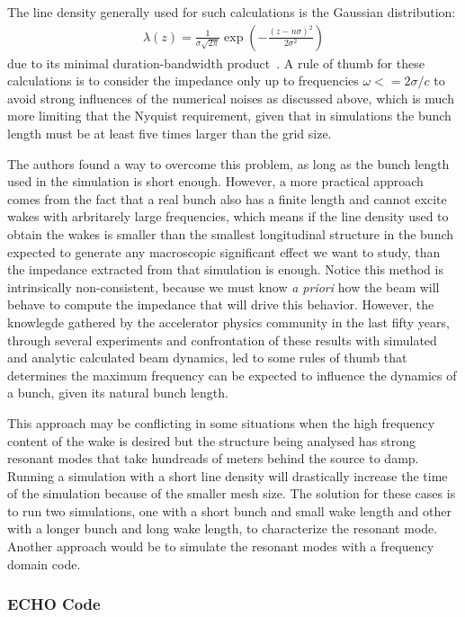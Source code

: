     The line density generally used for such calculations is the Gaussian distribution:
    \begin{align}
        \lambda(z) = \frac{1}{\sigma\sqrt{2\pi}}
        \exp\left(-\frac{(z-n\sigma)^2}{2\sigma^2}\right)
    \end{align}
    due to its minimal duration-bandwidth product~\cite{Niedermayer2016}. A rule of thumb for these calculations is to consider the impedance only up to frequencies $\omega<=2\sigma/c$ to avoid strong influences of the numerical noises as discussed above, which is much more limiting that the Nyquist requirement, given that in simulations the bunch length must be at least five times larger than the grid size.

    The authors  found a way to overcome this problem, as long as the bunch length used in the simulation is short enough. However, a more practical approach comes from the fact that a real bunch also has a finite length and cannot excite wakes with arbritarely large frequencies, which means if the line density used to obtain the wakes is smaller than the smallest longitudinal structure in the bunch expected to generate any macroscopic significant effect we want to study, than the impedance extracted from that simulation is enough. Notice this method is intrinsically non-consistent, because we must know \emph{a priori} how the beam will behave to compute the impedance that will drive this behavior. However, the knowlegde gathered by the accelerator physics community in the last fifty years, through several experiments and confrontation of these results with simulated and analytic calculated beam dynamics, led to some rules of thumb that determines the maximum frequency can be expected to influence the dynamics of a bunch, given its natural bunch length.

    This approach may be conflicting in some situations when the high frequency content of the wake is desired but the structure being analysed has strong resonant modes that take hundreads of meters behind the source to damp. Running a simulation with a short line density will drastically increase the time of the simulation because of the smaller mesh size. The solution for these cases is to run two simulations, one with a short bunch and small wake length and other with a longer bunch and long wake length, to characterize the resonant mode. Another approach would be to simulate the resonant modes with a frequency domain code.

\subsubsection{ECHO Code}

